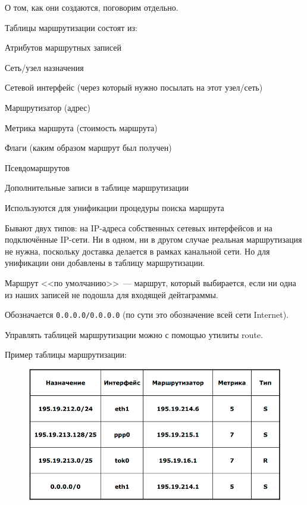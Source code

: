 О том, как они создаются, поговорим отдельно.

Таблицы маршрутизации состоят из:
\begin{MyItemize}
    \item Атрибутов маршрутных записей
    \begin{MyItemize}
        \item Сеть/узел назначения
        \item Сетевой интерфейс (через который нужно посылать на этот узел/сеть)
        \item Маршрутизатор (адрес)
        \item Метрика маршрута (стоимость маршрута)
        \item Флаги (каким образом маршрут был получен)
    \end{MyItemize}
    \item Псевдомаршрутов
    \begin{MyItemize}
        \item Дополнительные записи в таблице маршрутизации
        \item Используются для унификации процедуры поиска маршрута
        \item Бывают двух типов: на IP-адреса собственных сетевых интерфейсов и на подключённые IP-сети. Ни в одном, ни в другом случае реальная маршрутизация не нужна, поскольку доставка делается в рамках канальной сети. Но для унификации они добавлены в таблицу маршрутизации.
    \end{MyItemize}
\end{MyItemize}

Маршрут <<по умолчанию>>~--- маршрут, который выбирается, если ни одна из наших записей не подошла для входящей дейтаграммы.

Обозначается {\tt 0.0.0.0/0.0.0.0} (по сути это обозначение всей сети Internet). 

Управлять таблицей маршрутизации можно с помощью утилиты route.

Пример таблицы маршрутизации:

\begin{figure}[H]
  \centering
  \includegraphics[width=15cm]{images/04/02}
\end{figure}

